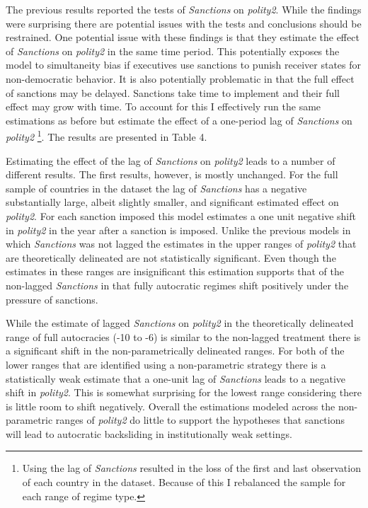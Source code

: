 \documentclass[a4paper]{article}\usepackage[]{graphicx}\usepackage[]{color}
\begin{document}
The previous results reported the tests of \textit{Sanctions} on \textit{polity2}. While the findings were surprising there are potential issues with the tests and conclusions should be restrained. One potential issue with these findings is that they estimate the effect of \textit{Sanctions} on \textit{polity2} in the same time period. This potentially exposes the model to simultaneity bias if executives use sanctions to punish receiver states for non-democratic behavior. It is also potentially problematic in that the full effect of sanctions may be delayed. Sanctions take time to implement and their full effect may grow with time. To account for this I effectively run the same estimations as before but estimate the effect of a one-period lag of \textit{Sanctions} on \textit{polity2} \footnote{Using the lag of \textit{Sanctions} resulted in the loss of the first and last observation of each country in the dataset. Because of this I rebalanced the sample for each range of regime type.}. The results are presented in Table 4. 
\par
Estimating the effect of the lag of \textit{Sanctions} on \textit{polity2} leads to a number of different results. The first results, however, is mostly unchanged. For the full sample of countries in the dataset the lag of \textit{Sanctions} has a negative substantially large, albeit slightly smaller, and significant estimated effect on \textit{polity2}. For each sanction imposed this model estimates a one unit negative shift in \textit{polity2} in the year after a sanction is imposed. Unlike the previous models in which \textit{Sanctions} was not lagged the estimates in the upper ranges of \textit{polity2} that are theoretically delineated are not statistically significant. Even though the estimates in these ranges are insignificant this estimation supports that of the non-lagged \textit{Sanctions} in that fully autocratic regimes shift positively under the pressure of sanctions. 
\par
While the estimate of lagged \textit{Sanctions} on \textit{polity2} in the theoretically delineated range of full autocracies (-10 to -6) is similar to the non-lagged treatment there is a significant shift in the non-parametrically delineated ranges. For both of the lower ranges that are identified using a non-parametric strategy there is a statistically weak estimate that a one-unit lag of \textit{Sanctions} leads to a negative shift in \textit{polity2}. This is somewhat surprising for the lowest range considering there is little room to shift negatively. Overall the estimations modeled across the non-parametric ranges of \textit{polity2} do little to support the hypotheses that sanctions will lead to autocratic backsliding in institutionally weak settings. 
\end{document}
